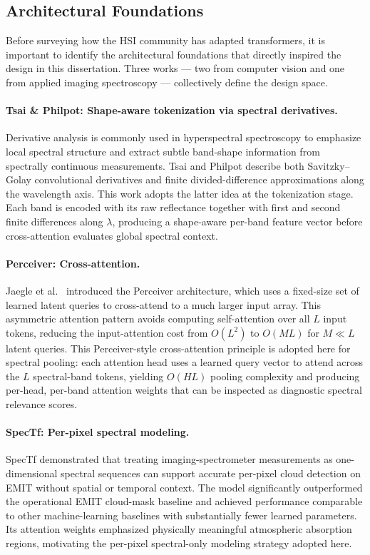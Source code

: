 \documentclass[11pt]{report}
\begin{document}
\subsection{Architectural Foundations}
\label{sec:arch_inspirations}

Before surveying how the HSI community has adapted transformers, it is important to identify the architectural foundations that directly inspired the design in this dissertation. Three works --- two from computer vision and one from applied imaging spectroscopy --- collectively define the design space.

\paragraph{Tsai \& Philpot: Shape-aware tokenization via spectral derivatives.}
Derivative analysis is commonly used in hyperspectral spectroscopy to emphasize local spectral structure and extract subtle band-shape information from spectrally continuous measurements. Tsai and Philpot \cite{tsai1998derivative} describe both Savitzky--Golay convolutional derivatives and finite divided-difference approximations along the wavelength axis. This work adopts the latter idea at the tokenization stage. Each band is encoded with its raw reflectance together with first and second finite differences along $\lambda$, producing a shape-aware per-band feature vector before cross-attention evaluates global spectral context.

\paragraph{Perceiver: Cross-attention.}
Jaegle et al.\ \cite{jaegle2021perceiver} introduced the Perceiver architecture, which uses a fixed-size set of learned latent queries to cross-attend to a much larger input array. This asymmetric attention pattern avoids computing self-attention over all $L$ input tokens, reducing the input-attention cost from $O(L^2)$ to $O(M L)$ for $M \ll L$ latent queries. This Perceiver-style cross-attention principle is adopted here for spectral pooling: each attention head uses a learned query vector to attend across the $L$ spectral-band tokens, yielding $O(HL)$ pooling complexity and producing per-head, per-band attention weights that can be inspected as diagnostic spectral relevance scores.

\paragraph{SpecTf: Per-pixel spectral modeling.}
SpecTf \cite{lee2025spectf} demonstrated that treating imaging-spectrometer measurements as one-dimensional spectral sequences can support accurate per-pixel cloud detection on EMIT without spatial or temporal context. The model significantly outperformed the operational EMIT cloud-mask baseline and achieved performance comparable to other machine-learning baselines with substantially fewer learned parameters. Its attention weights emphasized physically meaningful atmospheric absorption regions, motivating the per-pixel spectral-only modeling strategy adopted here.
\end{document}
